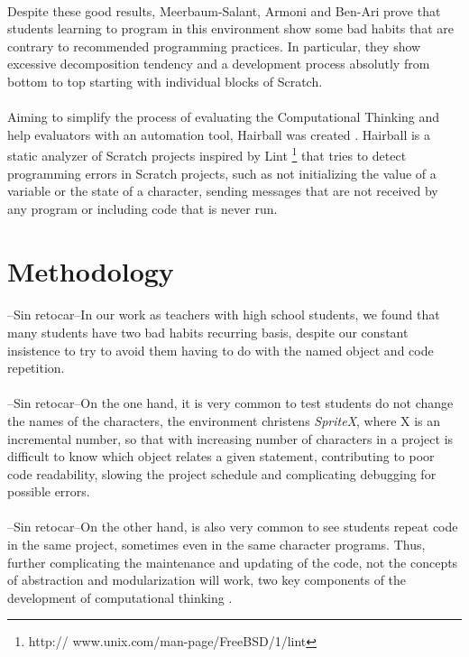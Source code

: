 \documentclass[a4paper,10pt]{article}
\begin{document}
\paragraph{}Despite these good results, Meerbaum-Salant, Armoni and Ben-Ari \cite{meerbaum2011habits} prove that students learning to program in this environment show some bad habits that are contrary to recommended programming practices. In particular, they show excessive decomposition tendency and a development process absolutly from bottom to top starting with individual blocks of Scratch.
\paragraph{} Aiming to simplify the process of evaluating the Computational Thinking and help evaluators with an automation tool, Hairball was created \cite{boe2013hairball}. Hairball is a static analyzer of Scratch projects inspired by Lint \footnote{http:// www.unix.com/man-page/FreeBSD/1/lint} that tries to detect programming errors in Scratch projects, such as not initializing the value of a variable or the state of a character, sending messages that are not received by any program or including code that is never run.

\section{Methodology}

\paragraph{}--Sin retocar--In our work as teachers with high school students, we found that many students have two bad habits recurring basis, despite our constant insistence to try to avoid them having to do with the named object and code repetition.

\paragraph{}--Sin retocar--On the one hand, it is very common to test students do not change the names of the characters, the environment christens \textit{SpriteX}, where X is an incremental number, so that with increasing number of characters in a project is difficult to know which object relates a given statement, contributing to poor code readability, slowing the project schedule and complicating debugging for possible errors.
\paragraph{}--Sin retocar--On the other hand, is also very common to see students repeat code in the same project, sometimes even in the same character programs. Thus, further complicating the maintenance and updating of the code, not the concepts of abstraction and modularization will work, two key components of the development of computational thinking \cite{wing2008computational}.
\end{document}
